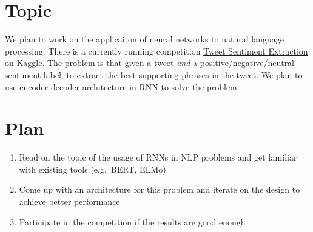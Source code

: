 \documentclass[10pt]{article}
\begin{document}
\newpage
\maketitle

\section{Topic}
We plan to work on the applicaiton of neural networks to natural
language processing.  There is a currently running competition
\href{https://www.kaggle.com/c/tweet-sentiment-extraction}{Tweet
  Sentiment Extraction} on Kaggle.  The problem is that given a tweet
\emph{and} a positive/negative/neutral sentiment label, to extract the
best supporting phrases in the tweet.  We plan to use encoder-decoder
architecture in RNN to solve the problem.

\section{Plan}
\begin{enumerate}
\item Read on the topic of the usage of RNNs in NLP problems and get
  familiar with existing tools (e.g.\ BERT, ELMo) 
\item Come up with an architecture for this problem and iterate on the
  design to achieve better performance
\item Participate in the competition if the results are good enough
\end{enumerate}

{}

\end{document}
